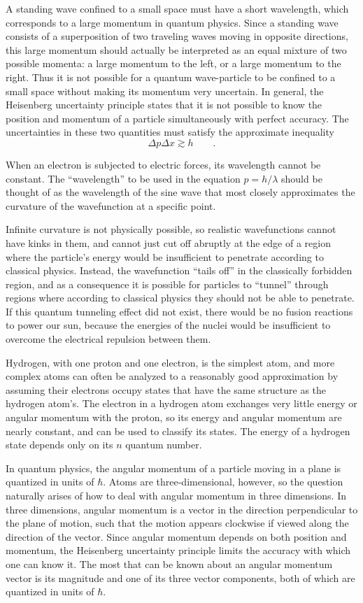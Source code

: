 A standing wave confined to a small space must have a short
wavelength, which corresponds to a large momentum in quantum
physics. Since a standing wave consists of a superposition
of two traveling waves moving in opposite directions, this
large momentum should actually be interpreted as an equal
mixture of two possible momenta: a large momentum to the
left, or a large momentum to the right. Thus it is not
possible for a quantum wave-particle to be confined to a
small space without making its momentum very uncertain. In
general, the Heisenberg uncertainty principle states that it
is not possible to know the position and momentum of a
particle simultaneously with perfect accuracy. The
uncertainties in these two quantities must satisfy the
approximate inequality
\begin{equation*}
    \Delta p\Delta x \gtrsim h     \qquad .
\end{equation*}

When an electron is subjected to electric forces, its
wavelength cannot be constant. The ``wavelength'' to be used
in the equation $p=h/\lambda$ should be thought of as the
wavelength of the sine wave that most closely approximates
the curvature of the wavefunction at a specific point.

Infinite curvature is not physically possible, so realistic
wavefunctions cannot have kinks in them, and cannot just cut
off abruptly at the edge of a region where the particle's
energy would be insufficient to penetrate according to
classical physics. Instead, the wavefunction ``tails off''
in the classically forbidden region, and as a consequence it
is possible for particles to ``tunnel'' through regions
where according to classical physics they should not be able
to penetrate. If this quantum tunneling effect did not
exist, there would be no fusion reactions to power our sun,
because the energies of the nuclei would be insufficient to
overcome the electrical repulsion between them.

Hydrogen, with one proton and one electron, is the simplest
atom, and more complex atoms can often be analyzed to a
reasonably good approximation by assuming their electrons
occupy states that have the same structure as the hydrogen
atom's. The electron in a hydrogen atom exchanges very
little energy or angular momentum with the proton, so its
energy and angular momentum are nearly constant, and can be
used to classify its states. The energy of a hydrogen state
depends only on its $n$ quantum number.

In quantum physics, the angular momentum of a particle
moving in a plane is quantized in units of $\hbar$. Atoms are
three-dimensional, however, so the question naturally arises
of how to deal with angular momentum in three dimensions. In
three dimensions, angular momentum is a vector in the
direction perpendicular to the plane of motion, such that
the motion appears clockwise if viewed along the direction
of the vector. Since angular momentum depends on both
position and momentum, the Heisenberg uncertainty principle
limits the accuracy with which one can know it. The most that
can be known about an angular momentum vector is its
magnitude and one of its three vector components, both of
which are quantized in units of $\hbar$.

